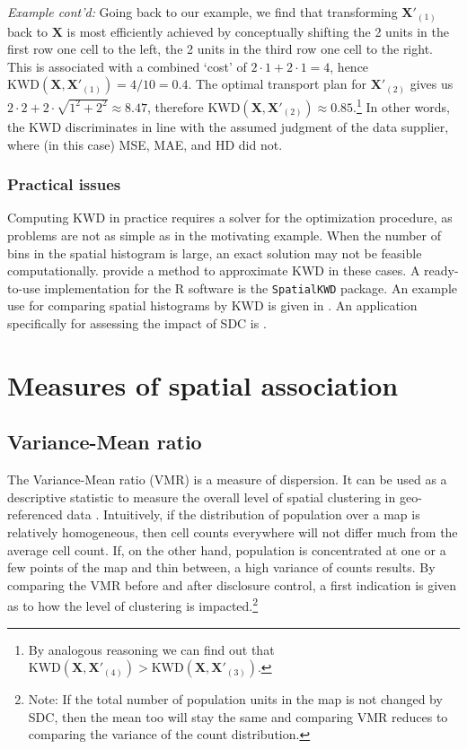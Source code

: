 \begin{tcolorbox}[breakable]
\emph{Example cont'd:}
Going back to our example, we find that transforming $\mathbf{X}'_{(1)}$ back to $\mathbf{X}$ is most efficiently achieved by conceptually shifting the 2 units in the first row one cell to the left, the 2 units in the third row one cell to the right. This is associated with a combined `cost' of $2 \cdot 1 + 2 \cdot 1 = 4$, hence $\mathrm{KWD}(\mathbf{X}, \mathbf{X}'_{(1)}) = 4/10 = 0.4$. The optimal transport plan for $\mathbf{X}'_{(2)}$ gives us $2 \cdot 2 + 2 \cdot \sqrt{1^2 + 2^2} \approx 8.47$, therefore $\mathrm{KWD}(\mathbf{X}, \mathbf{X}'_{(2)}) \approx 0.85$.\footnote{
    By analogous reasoning we can find out that $\mathrm{KWD}(\mathbf{X}, \mathbf{X}'_{(4)}) > \mathrm{KWD}(\mathbf{X}, \mathbf{X}'_{(3)})$.}
In other words, the KWD discriminates in line with the assumed judgment of the data supplier, where (in this case) MSE, MAE, and HD did not.
\end{tcolorbox}

\subsubsection{Practical issues}

Computing KWD in practice requires a solver for the optimization procedure, as problems are not as simple as in the motivating example. When the number of bins in the spatial histogram is large, an exact solution may not be feasible computationally. \cite{BassettiEtAl2020} provide a method to approximate KWD in these cases. A ready-to-use implementation for the R software is the \texttt{SpatialKWD} package.
An example use for comparing spatial histograms by KWD is given in \cite{RicciatoColuccia2023}. An application specifically for assessing the impact of SDC is \cite{GussenbauerEtAl2023}.


\section{Measures of spatial association} \label{sec:util_SPAT}

\subsection{Variance-Mean ratio}

The Variance-Mean ratio (VMR) is a measure of dispersion. It can be used as a descriptive statistic to measure the overall level of spatial clustering in geo-referenced data \citep{Cressie1993}. Intuitively, if the distribution of population over a map is relatively homogeneous, then cell counts everywhere will not differ much from the average cell count. If, on the other hand, population is concentrated at one or a few points of the map and thin between, a high variance of counts results. By comparing the VMR before and after disclosure control, a first indication is given as to how the level of clustering is impacted.\footnote{
    Note: If the total number of population units in the map is not changed by SDC, then the mean too will stay the same and comparing VMR reduces to comparing the variance of the count distribution.} 

